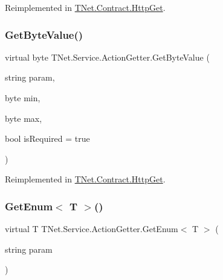 Reimplemented in \mbox{\hyperlink{class_t_net_1_1_contract_1_1_http_get_a3ccff46a3fda076f3c990959879a4c32}{T\+Net.\+Contract.\+Http\+Get}}.

\mbox{\label{class_t_net_1_1_service_1_1_action_getter_a8eaa7a6f8762849c0d881d9aad835219}} 
\subsubsection{\texorpdfstring{Get\+Byte\+Value()}{GetByteValue()}\hspace{0.1cm}{\footnotesize\ttfamily [2/2]}}
{\footnotesize\ttfamily virtual byte T\+Net.\+Service.\+Action\+Getter.\+Get\+Byte\+Value (\begin{DoxyParamCaption}\item[{string}]{param,  }\item[{byte}]{min,  }\item[{byte}]{max,  }\item[{bool}]{is\+Required = {\ttfamily true} }\end{DoxyParamCaption})\hspace{0.3cm}{\ttfamily [virtual]}}







Reimplemented in \mbox{\hyperlink{class_t_net_1_1_contract_1_1_http_get_ad924042121eb9623312921851ef2a1cf}{T\+Net.\+Contract.\+Http\+Get}}.

\mbox{\label{class_t_net_1_1_service_1_1_action_getter_aa31cf64fa46ebe6448abb26ed271c15b}} 
\subsubsection{\texorpdfstring{Get\+Enum$<$ T $>$()}{GetEnum< T >()}\hspace{0.1cm}{\footnotesize\ttfamily [1/2]}}
{\footnotesize\ttfamily virtual T T\+Net.\+Service.\+Action\+Getter.\+Get\+Enum$<$ T $>$ (\begin{DoxyParamCaption}\item[{string}]{param }\end{DoxyParamCaption})\hspace{0.3cm}{\ttfamily [virtual]}}







